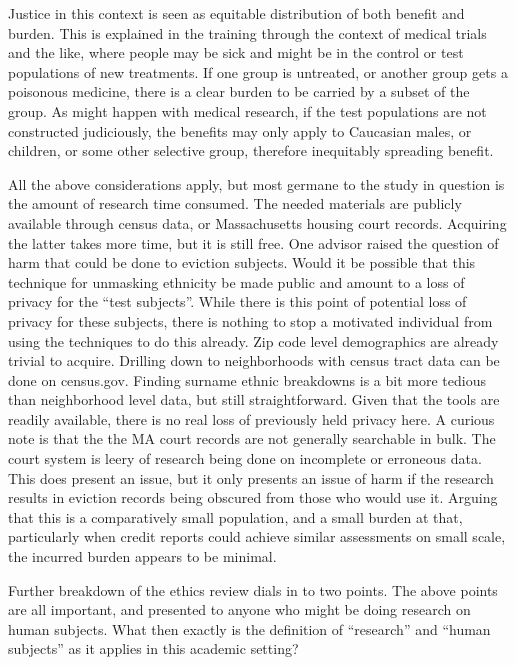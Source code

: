 \par
Justice in this context is seen as equitable distribution of both benefit and burden.  This is explained in the training through the context of medical trials and the like, where people may be sick and might be in the control or test populations of new treatments.  If one group is untreated, or another group gets a poisonous medicine, there is a clear burden to be carried by a subset of the group.  As might happen with medical research, if the test populations are not constructed judiciously, the benefits may only apply to Caucasian males, or children, or some other selective group, therefore inequitably spreading benefit. \par

All the above considerations apply, but most germane to the study in question is the amount of research time consumed.  The needed materials are publicly available through census data, or Massachusetts housing court records.   Acquiring the latter takes more time, but it is still free.  One advisor raised the question of harm that could be done to eviction subjects.  Would it be possible that this technique for unmasking ethnicity be made public and amount to a loss of privacy for the “test subjects”.  While there is this point of potential loss of privacy for these subjects, there is nothing to stop a motivated individual from using the techniques to do this already.  Zip code level demographics are already trivial to acquire.  Drilling down to neighborhoods with census tract data can be done on census.gov.  Finding surname ethnic breakdowns is a bit more tedious than neighborhood level data, but still straightforward.  Given that the tools are readily available, there is no real loss of previously held privacy here.  A curious note is that the the MA court records are not generally searchable in bulk.  The court system is leery of research being done on incomplete or erroneous data.  This does present an issue, but it only presents an issue of harm if the research results in eviction records being obscured from those who would use it.  Arguing that this is a comparatively small population, and a small burden at that, particularly when credit reports could achieve similar assessments on small scale, the incurred burden appears to be minimal. \par
Further breakdown of the ethics review dials in to two points.  The above points are all important, and presented to anyone who might be doing research on human subjects. What then exactly is the definition of “research” and “human subjects” as it applies in this academic setting?
